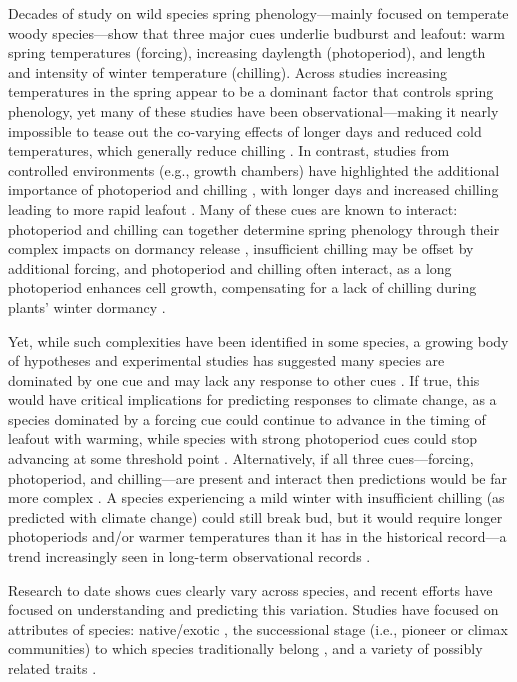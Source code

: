 \documentclass[11pt]{article}
\begin{document}
Decades of study on wild species spring phenology---mainly focused on temperate woody species---show that three major cues underlie budburst and leafout: warm spring temperatures (forcing), increasing daylength (photoperiod), and length and intensity of winter temperature (chilling). Across studies increasing temperatures in the spring appear to be a dominant factor that controls spring phenology, yet many of these studies have been observational---making it nearly impossible to tease out the co-varying effects of longer days and reduced cold temperatures, which generally reduce chilling \citep{chuineJTB,Cook:2012pnas}. In contrast, studies from controlled environments (e.g., growth chambers) have highlighted the additional importance of photoperiod and chilling \citep{Heide:1993b,Falusi:1996aa,Foley:2009aa,Ghelardini:2010aa,Caffarra:2011aa}, with longer days and increased chilling leading to more rapid leafout \citep{Caffarra:2011ab}. Many of these cues are known to interact: photoperiod and chilling can together determine spring phenology through their complex impacts on dormancy release \citep{chuineJTB}, insufficient chilling may be offset by additional forcing, and photoperiod and chilling often interact, as a long photoperiod enhances cell growth, compensating for a lack of chilling during plants' winter dormancy \citep{Heide:1993b,Myking:1995,Caffarra:2011aa}.

Yet, while such complexities have been identified in some species, a growing body of hypotheses and experimental studies has suggested many species are dominated by one cue and may lack any response to other cues \citep{Korner:2010}. If true, this would have critical implications for predicting responses to climate change, as a species dominated by a forcing cue could continue to advance in the timing of leafout with warming, while species with strong photoperiod cues could stop advancing at some threshold point \citep{Korner:2010}. Alternatively, if all three cues---forcing, photoperiod, and chilling---are present and interact then predictions would be far more complex \citep{Chuine:1999aa}. A species experiencing a mild winter with insufficient chilling (as predicted with climate change) could still break bud, but it would require longer photoperiods and/or warmer temperatures \citep{Heide:1993b} than it has in the historical record---a trend increasingly seen in long-term observational records \citep[e.g,][]{fu2015,carter2017}. 

Research to date shows cues clearly vary across species, and recent efforts have focused on understanding and predicting this variation. Studies have focused on attributes of species: native/exotic \citep{Willis:2010al}, the successional stage (i.e., pioneer or climax communities) to which species traditionally belong \citep{laube2014gcb,Basler:2012aa}, and a variety of possibly related traits \citep{Lechowicz:1984aa,Polgar:2014aa}. 
\end{document}
